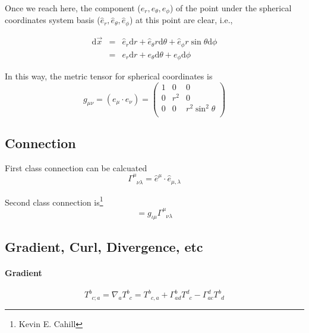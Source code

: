 \documentclass[11pt]{book}
\begin{document}
Once we reach here, the component ($e_r ,e_\theta, e_\phi$) of the point under the spherical coordinates system basis ($\hat e_r, \hat e_\theta, \hat e_\phi$) at this point are clear, i.e.,

\begin{eqnarray}
\mathrm d\vec x&=&\hat e_r\mathrm d r+\hat e_\theta r\mathrm d \theta+\hat e_\phi r\sin\theta \mathrm d\phi \\
&=&e_r\mathrm d r+e_\theta \mathrm d\theta+e_\phi \mathrm d\phi
\end{eqnarray}

In this way, the metric tensor for spherical coordinates is 
\begin{equation}
g_{\mu\nu}=(e_\mu\cdot e_\nu)=\left(\begin{matrix}
1 &0&0 \\
0& r^2&0 \\
0&0& r^2\sin^2\theta \\
\end{matrix}\right)
\end{equation}



\subsection{Connection}

First class connection can be calcuated 
\begin{equation}
\Gamma^\mu_{\phantom{\mu}\nu\lambda}=\hat e^\mu\cdot \hat e_{\mu,\lambda}
\end{equation}

Second class connection is\footnote{Kevin E. Cahill}
\begin{equation}
[\mu\nu,\iota]=g_{\iota\mu}\Gamma^\mu_{\phantom{\mu}\nu\lambda}
\end{equation}




\subsection{Gradient, Curl, Divergence, etc}

\paragraph{Gradient} 
\begin{equation}
T^b_{\phantom bc;a}= \nabla_aT^b_{\phantom bc}=T^b_{\phantom bc,a}+\Gamma^b_{ad}T^d_{\phantom dc}-\Gamma^d_{ac}T^b_{\phantom bd}
\end{equation}
\end{document}
